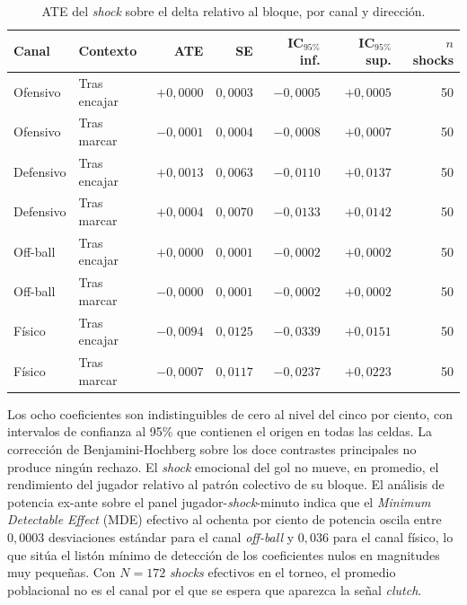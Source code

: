 \begin{table}[h]
  \centering
  \small
  \caption{ATE del \textit{shock} sobre el delta relativo al bloque,
    por canal y dirección.}
  \label{tab:ate-poblacional}
  \begin{tabular}{llrrrrr}
    \toprule
    Canal & Contexto & ATE & SE & IC$_{95\%}$ inf. & IC$_{95\%}$ sup. & $n$ shocks \\
    \midrule
    Ofensivo   & Tras encajar &  $+0{,}0000$ & $0{,}0003$ & $-0{,}0005$ & $+0{,}0005$ & 50 \\
    Ofensivo   & Tras marcar  &  $-0{,}0001$ & $0{,}0004$ & $-0{,}0008$ & $+0{,}0007$ & 50 \\
    Defensivo  & Tras encajar &  $+0{,}0013$ & $0{,}0063$ & $-0{,}0110$ & $+0{,}0137$ & 50 \\
    Defensivo  & Tras marcar  &  $+0{,}0004$ & $0{,}0070$ & $-0{,}0133$ & $+0{,}0142$ & 50 \\
    Off-ball   & Tras encajar &  $+0{,}0000$ & $0{,}0001$ & $-0{,}0002$ & $+0{,}0002$ & 50 \\
    Off-ball   & Tras marcar  &  $-0{,}0000$ & $0{,}0001$ & $-0{,}0002$ & $+0{,}0002$ & 50 \\
    Físico     & Tras encajar &  $-0{,}0094$ & $0{,}0125$ & $-0{,}0339$ & $+0{,}0151$ & 50 \\
    Físico     & Tras marcar  &  $-0{,}0007$ & $0{,}0117$ & $-0{,}0237$ & $+0{,}0223$ & 50 \\
    \bottomrule
  \end{tabular}
\end{table}

Los ocho coeficientes son indistinguibles de cero al nivel del cinco
por ciento, con intervalos de confianza al 95\% que contienen el
origen en todas las celdas. La corrección de Benjamini-Hochberg
sobre los doce contrastes principales no produce ningún rechazo. El
\textit{shock} emocional del gol no mueve, en promedio, el rendimiento
del jugador relativo al patrón colectivo de su bloque. El análisis de potencia ex-ante sobre el
panel jugador-\textit{shock}-minuto indica que el \textit{Minimum
Detectable Effect} (MDE) efectivo al ochenta por ciento de potencia
oscila entre $0{,}0003$ desviaciones estándar para el canal
\textit{off-ball} y $0{,}036$ para el canal físico, lo que sitúa el
listón mínimo de detección de los coeficientes nulos en magnitudes
muy pequeñas. Con $N=172$ \textit{shocks} efectivos en el torneo, el
promedio poblacional no es el canal por el que se espera que aparezca
la señal \textit{clutch}.


